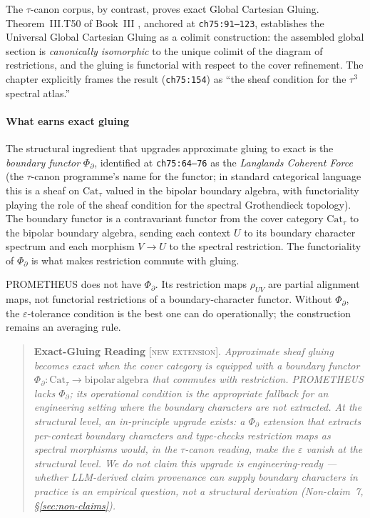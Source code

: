 \documentclass{pantarhei-researchnote}
\newcommand{\NEXT}{\textsc{[new extension]}}
\newcommand{\PsiD}{\ensuremath{\Phi_{\partial}}}
\newcommand{\Cattau}{\ensuremath{\mathrm{Cat}_{\tau}}}
\begin{document}
The $\tau$-canon corpus, by contrast, proves exact Global Cartesian
Gluing. Theorem~III.T50 of Book~III \cite{PantaRhei-BookIII},
anchored at \texttt{ch75:91--123}, establishes the Universal Global
Cartesian Gluing as a colimit construction: the assembled global
section is \emph{canonically isomorphic} to the unique colimit of
the diagram of restrictions, and the gluing is functorial with
respect to the cover refinement. The chapter explicitly frames the
result (\texttt{ch75:154}) as ``the sheaf condition for the $\tau^{3}$
spectral atlas.''

\paragraph{What earns exact gluing}
The structural ingredient that upgrades approximate gluing to
exact is the \emph{boundary functor} $\PsiD$, identified at
\texttt{ch75:64--76} as the \emph{Langlands Coherent Force}
(the $\tau$-canon programme's name for the functor; in standard
categorical language this is a sheaf on $\Cattau$ valued in the
bipolar boundary algebra, with functoriality playing the role of
the sheaf condition for the spectral Grothendieck topology). The
boundary functor is a contravariant functor from the cover category
$\Cattau$ to the bipolar boundary algebra, sending each context $U$
to its boundary character spectrum and each morphism $V \to U$ to
the spectral restriction. The functoriality of $\PsiD$ is what makes
restriction commute with gluing.

PROMETHEUS does not have $\PsiD$. Its restriction maps $\rho_{UV}$
are partial alignment maps, not functorial restrictions of a
boundary-character functor. Without $\PsiD$, the $\varepsilon$-tolerance
condition is the best one can do operationally; the construction
remains an averaging rule.

\begin{quote}
\textbf{Exact-Gluing Reading} \NEXT. \emph{Approximate sheaf gluing
becomes exact when the cover category is equipped with a boundary
functor $\PsiD : \Cattau \to \mathrm{bipolar\,algebra}$ that
commutes with restriction. PROMETHEUS lacks $\PsiD$; its operational
condition is the appropriate fallback for an engineering setting
where the boundary characters are not extracted. At the structural
level, an in-principle upgrade exists: a $\PsiD$ extension that
extracts per-context boundary characters and type-checks restriction
maps as spectral morphisms would, in the $\tau$-canon reading, make
the $\varepsilon$ vanish at the structural level. We do not claim
this upgrade is engineering-ready --- whether LLM-derived claim
provenance can supply boundary characters in practice is an
empirical question, not a structural derivation (Non-claim~7,
\S\ref{sec:non-claims}).}
\end{quote}
\end{document}
